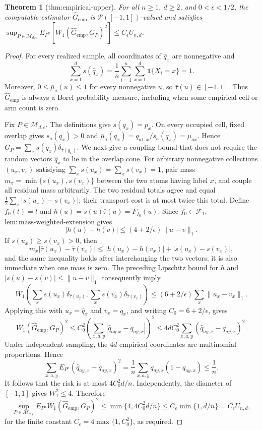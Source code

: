 \documentclass{article}
\newtheorem{theorem}{Theorem}
\begin{document}
\begin{theorem}[thm:empirical-upper]\label{thm:empirical-upper}
For all \(n\ge1\), \(d\ge2\), and \(0<\epsilon<1/2\), the computable estimator \(\widehat G_{\mathrm{emp}}\) is \(\mathcal P([-1,1])\)-valued and satisfies \(\sup_{P\in\mathcal M_{d,\epsilon}}E_{P^n}[W_1(\widehat G_{\mathrm{emp}},G_P)^2]\le C_\epsilon U_{n,d}\).
\end{theorem}
\begin{proof}
For every realized sample, all coordinates of \(\widehat q_x\) are nonnegative and
\[
\sum_{x=1}^d s(\widehat q_x)
=\frac1n\sum_{i=1}^n\sum_{x=1}^d\mathbf 1\{X_i=x\}=1.
\]
Moreover, \(0\leq\bar\mu_a(u)\leq1\) for every nonnegative \(u\), so \(\bar\tau(u)\in[-1,1]\).  Thus \(\widehat G_{\mathrm{emp}}\) is always a Borel probability measure, including when some empirical cell or arm count is zero.

Fix \(P\in\mathcal M_{d,\epsilon}\).  The definitions give \(s(q_x)=p_x\).  On every occupied cell, fixed overlap gives \(s_a(q_x)>0\) and \(\bar\mu_a(q_x)=q_{a1,x}/s_a(q_x)=\mu_{ax}\).  Hence \(G_P=\sum_xs(q_x)\delta_{\bar\tau(q_x)}\).  We next give a coupling bound that does not require the random vectors \(\widehat q_x\) to lie in the overlap cone.  For arbitrary nonnegative collections \((u_x,v_x)\) satisfying \(\sum_xs(u_x)=\sum_xs(v_x)=1\), pair mass \(m_x=\min\{s(u_x),s(v_x)\}\) between the two atoms having label \(x\), and couple all residual mass arbitrarily.  The two residual totals agree and equal \(\frac12\sum_x|s(u_x)-s(v_x)|\); their transport cost is at most twice this total.  Define \(f_0(t)=t\) and \(h(u)=s(u)\bar\tau(u)=F_{f_0}(u)\).  Since \(f_0\in\mathcal F_1\), \(\mathrm{lem:mass\mbox{-}weighted\mbox{-}extension}\) gives
\[
|h(u)-h(v)|\leq(4+2/\epsilon)\lVert u-v\rVert_1.
\]
If \(s(u_x)\geq s(v_x)>0\), then
\[
m_x\left|\bar\tau(u_x)-\bar\tau(v_x)\right|
\leq |h(u_x)-h(v_x)|+|s(u_x)-s(v_x)|,
\]
and the same inequality holds after interchanging the two vectors; it is also immediate when one mass is zero.  The preceding Lipschitz bound for \(h\) and \(|s(u)-s(v)|\leq\lVert u-v\rVert_1\) consequently imply
\[
W_1\left(\sum_xs(u_x)\delta_{\bar\tau(u_x)},
          \sum_xs(v_x)\delta_{\bar\tau(v_x)}\right)
\leq(6+2/\epsilon)\sum_x\lVert u_x-v_x\rVert_1.
\]
Applying this with \(u_x=\widehat q_x\) and \(v_x=q_x\), and writing \(C_0=6+2/\epsilon\), gives
\[
W_1(\widehat G_{\mathrm{emp}},G_P)^2
\leq C_0^2\left(\sum_{x,a,y}|\widehat q_{ay,x}-q_{ay,x}|\right)^2
\leq4dC_0^2\sum_{x,a,y}(\widehat q_{ay,x}-q_{ay,x})^2.
\]
Under independent sampling, the \(4d\) empirical coordinates are multinomial proportions.  Hence
\[
\sum_{x,a,y}E_{P^n}(\widehat q_{ay,x}-q_{ay,x})^2
=\frac1n\sum_{x,a,y}q_{ay,x}(1-q_{ay,x})\leq\frac1n.
\]
It follows that the risk is at most \(4C_0^2d/n\).  Independently, the diameter of \([-1,1]\) gives \(W_1^2\leq4\).  Therefore
\[
\sup_{P\in\mathcal M_{d,\epsilon}}E_{P^n}W_1(\widehat G_{\mathrm{emp}},G_P)^2
\leq \min\{4,4C_0^2d/n\}
\leq C_\epsilon\min\{1,d/n\}=C_\epsilon U_{n,d},
\]
for the finite constant \(C_\epsilon=4\max\{1,C_0^2\}\), as required.
\end{proof}
\end{document}
